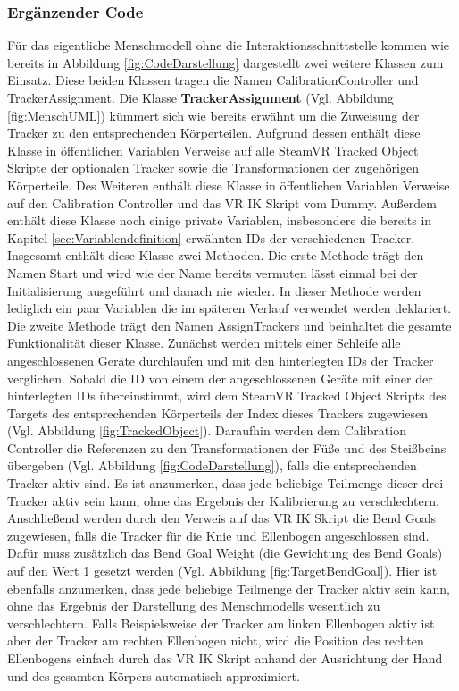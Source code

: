 \subsubsection{Ergänzender Code}\label{sec:MMCode}
Für das eigentliche Menschmodell ohne die Interaktionsschnittstelle kommen wie bereits in Abbildung \ref{fig:CodeDarstellung} dargestellt zwei weitere Klassen zum Einsatz. Diese beiden Klassen tragen die Namen CalibrationController und TrackerAssignment.
\newline\newline
Die Klasse \textbf{TrackerAssignment} (Vgl. Abbildung \ref{fig:MenschUML}) kümmert sich wie bereits erwähnt um die Zuweisung der Tracker zu den entsprechenden Körperteilen. Aufgrund dessen enthält diese Klasse in öffentlichen Variablen Verweise auf alle SteamVR Tracked Object Skripte der optionalen Tracker sowie die Transformationen der zugehörigen Körperteile. Des Weiteren enthält diese Klasse in öffentlichen Variablen Verweise auf den Calibration Controller und das VR IK Skript vom Dummy. Außerdem enthält diese Klasse noch einige private Variablen, insbesondere die bereits in Kapitel \ref{sec:Variablendefinition} erwähnten IDs der verschiedenen Tracker.
\newline
Insgesamt enthält diese Klasse zwei Methoden. Die erste Methode trägt den Namen Start und wird wie der Name bereits vermuten lässt einmal bei der Initialisierung ausgeführt und danach nie wieder. In dieser Methode werden lediglich ein paar Variablen die im späteren Verlauf verwendet werden deklariert. Die zweite Methode trägt den Namen AssignTrackers und beinhaltet die gesamte Funktionalität dieser Klasse.
\newline
Zunächst werden mittels einer Schleife alle angeschlossenen Geräte durchlaufen und mit den hinterlegten IDs der Tracker verglichen. Sobald die ID von einem der angeschlossenen Geräte mit einer der hinterlegten IDs übereinstimmt, wird dem SteamVR Tracked Object Skripts des Targets des entsprechenden Körperteils der Index dieses Trackers zugewiesen (Vgl. Abbildung \ref{fig:TrackedObject}).
\newline
Daraufhin werden dem Calibration Controller die Referenzen zu den Transformationen der Füße und des Steißbeins übergeben (Vgl. Abbildung \ref{fig:CodeDarstellung}), falls die entsprechenden Tracker aktiv sind. Es ist anzumerken, dass jede beliebige Teilmenge dieser drei Tracker aktiv sein kann, ohne das Ergebnis der Kalibrierung zu verschlechtern.
\newline
Anschließend werden durch den Verweis auf das VR IK Skript die Bend Goals zugewiesen, falls die Tracker für die Knie und Ellenbogen angeschlossen sind. Dafür muss zusätzlich das Bend Goal Weight (die Gewichtung des Bend Goals) auf den Wert 1 gesetzt werden (Vgl. Abbildung \ref{fig:TargetBendGoal}). Hier ist ebenfalls anzumerken, dass jede beliebige Teilmenge der Tracker aktiv sein kann, ohne das Ergebnis der Darstellung des Menschmodells wesentlich zu verschlechtern. Falls Beispielsweise der Tracker am linken Ellenbogen aktiv ist aber der Tracker am rechten Ellenbogen nicht, wird die Position des rechten Ellenbogens einfach durch das VR IK Skript anhand der Ausrichtung der Hand und des gesamten Körpers automatisch approximiert.
